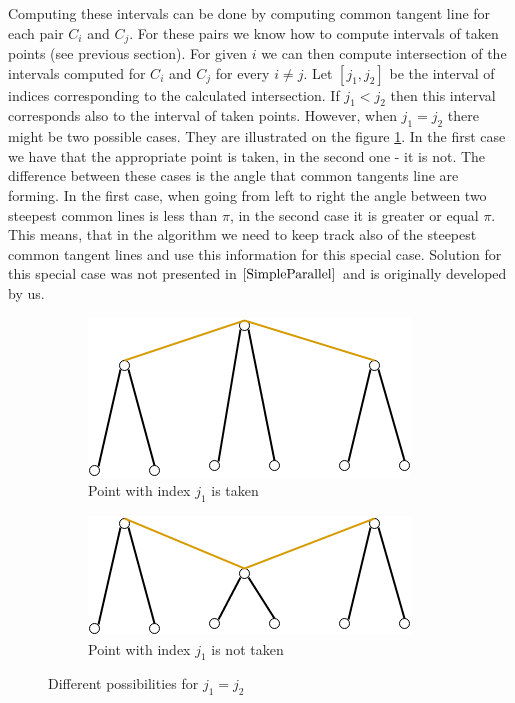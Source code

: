 \documentclass[letterpaper]{article}
\theoremstyle{definition}
\begin{document}
Computing these intervals can be done by computing common tangent line for each pair $C_i$ and $C_j$.
For these pairs we know how  to compute intervals of taken points (see previous section). 
For given $i$ we can then compute intersection of the intervals computed for $C_i$ and $C_j$ for every $i \neq j$.
Let $[j_1, j_2]$ be the interval of indices corresponding to the calculated intersection.
If $j_1 < j_2$ then this interval corresponds also to the interval of taken points.
However, when $j_1 = j_2$ there might be two possible cases.
They are illustrated on the figure \ref{fig:simple-parallel}.
In the first case we have that the appropriate point is taken, in the second one - it is not.
The difference between these cases is the angle that common tangents line are forming.
In the first case, when going from left to right the angle between two steepest common lines is less than $\pi$, in the second case it is greater or equal $\pi$.
This means, that in the algorithm we need to keep track also of the steepest common tangent lines and use this information for this special case.
Solution for this special case was not presented in $\cite{SimpleParallel}$ and is originally developed by us.

\begin{figure}
\centering
\begin{subfigure}{.3\textwidth}
	\centering
	\includegraphics[width=\linewidth]{img/simple-parallel-taking}
	\caption{Point with index $j_1$ is taken}
\end{subfigure}
\begin{subfigure}{.3\textwidth}
	\centering
	\includegraphics[width=\linewidth]{img/simple-parallel-not-taking}
	\caption{Point with index $j_1$ is not taken}
\end{subfigure}
\caption{Different possibilities for $j_1 = j_2$}
\label{fig:simple-parallel}
\end{figure}
\end{document}
